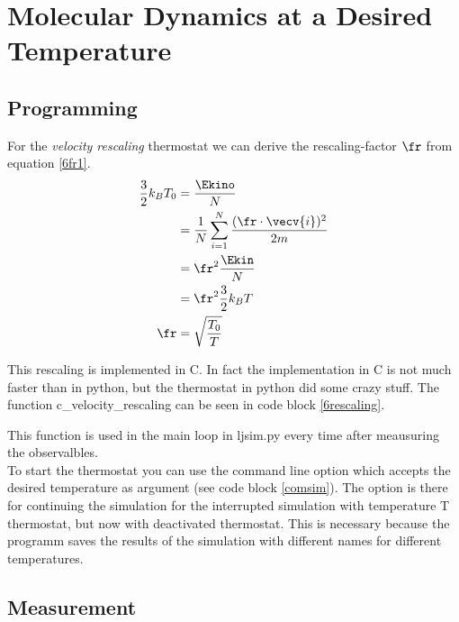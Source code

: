 \section{Molecular Dynamics at a Desired Temperature}

\subsection*{Programming}

For the \emph{velocity rescaling} thermostat we can derive the rescaling-factor $\fr$ from equation \eqref{6fr1}.
\begin{align}
\frac{3}{2}k_BT_0
	&= \frac{\Ekino}{N}
	\label{6fr1}\\
&= \frac{1}{N}\sum_{i=1}^{N} \frac{(\fr\cdot\vecv{i})^2}{2m}
	\label{6fr2}\\
&= \fr^2\frac{\Ekin}{N}
	\label{6fr3}\\
&=\fr^2\frac{3}{2}k_BT
	\label{6fr4}\\
\fr
	&= \sqrt{\frac{T_0}{T}}
	\label{6r5}
\end{align}

This rescaling is implemented in C. In fact the implementation in C is not much faster than in python, but the thermostat in python did some crazy stuff.
The function c\_velocity\_rescaling can be seen in code block \ref{6rescaling}.


This function is used in the main loop in ljsim.py every time after meausuring the observalbles.\\

To start the thermostat you can use the command line option  which accepts the desired temperature as argument (see code block \ref{comsim}).
The option  is there for continuing the simulation for the interrupted simulation with temperature T thermostat, but now with deactivated thermostat.
This is necessary because the programm saves the results of the simulation with different names for different temperatures.

\subsection*{Measurement}

